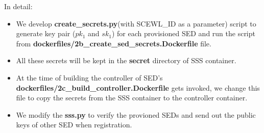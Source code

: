 \documentclass[11pt,oneside,onecolumn,letterpaper]{article}
\begin{document}
In detail:
\begin{itemize}
      \item We develop \textbf{create\_secrets.py}(with SCEWL\_ID as a parameter) script to generate key pair ($pk_1$ and $sk_1$) for each provisioned SED and run the script from  \textbf{dockerfiles/2b\_create\_sed\_secrets.Dockerfile} file.

      \item All these secrets will be kept in the \textbf{secret} directory of SSS container.
      \item At the time of building the controller of SED's \textbf{dockerfiles/2c\_build\_controller.Dockerfile}  gets invoked, we change this file to copy the secrets from the SSS container to the controller container.
      \item We modify the \textbf{sss.py} to verify the provioned SEDs and send out the public keys of other SED when registration.
\end{itemize}



\end{document}
